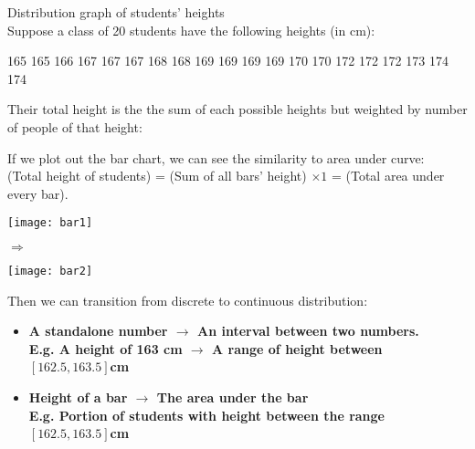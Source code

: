 \documentclass[class=article, crop=false, 12pt]{standalone}
\begin{document}
\begin{example} Distribution graph of students' heights\\

    Suppose a class of 20 students have the following heights (in cm):

    \begin{center}
        165 165 166 167 167 167 168 168 169 169 169 169 170 170 172 172 172 173 174 174
    \end{center}

    Their total height is the the sum of each possible heights but weighted by number of people of that height:

    If we plot out the bar chart, we can see the similarity to area under curve: \\ 
    (Total height of students) = (Sum of all bars' height) $\times 1$ = (Total area under every bar). 

    \begin{center}
        \begin{minipage}{0.45\textwidth}
            \texttt{[image: bar1]}
        \end{minipage}
        $\Rightarrow$
        \begin{minipage}{0.45\textwidth}
            \texttt{[image: bar2]}
        \end{minipage}
    \end{center}
    

\end{example}

Then we can transition from discrete to continuous distribution: 
\begin{itemize}
    \item \bf{A standalone number $\rightarrow$ An interval between two numbers.}\\
    E.g. A height of 163 cm $\rightarrow$ A range of height between $[162.5, 163.5] $cm

    \item \bf{Height of a bar $\rightarrow$ The area under the bar}\\
    E.g. Portion of students with height between the range $[162.5, 163.5] $cm
\end{itemize}
\end{document}
